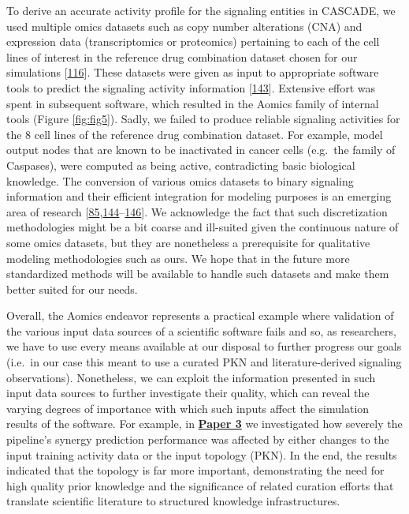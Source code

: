 \documentclass[
  12pt,
]{book}
\begin{document}
To derive an accurate activity profile for the signaling entities in CASCADE, we used multiple omics datasets such as copy number alterations (CNA) and expression data (transcriptomics or proteomics) pertaining to each of the cell lines of interest in the reference drug combination dataset chosen for our simulations {[}\protect\hyperlink{ref-Flobak2019}{116}{]}.
These datasets were given as input to appropriate software tools to predict the signaling activity information {[}\protect\hyperlink{ref-Vaske2010}{143}{]}.
Extensive effort was spent in subsequent software, which resulted in the Aomics family of internal tools (Figure \ref{fig:fig5}).
Sadly, we failed to produce reliable signaling activities for the 8 cell lines of the reference drug combination dataset.
For example, model output nodes that are known to be inactivated in cancer cells (e.g.~the family of Caspases), were computed as being active, contradicting basic biological knowledge.
The conversion of various omics datasets to binary signaling information and their efficient integration for modeling purposes is an emerging area of research {[}\protect\hyperlink{ref-Beal2018}{85},\protect\hyperlink{ref-Martignetti2016}{144}--\protect\hyperlink{ref-Dugourd2021}{146}{]}.
We acknowledge the fact that such discretization methodologies might be a bit coarse and ill-suited given the continuous nature of some omics datasets, but they are nonetheless a prerequisite for qualitative modeling methodologies such as ours.
We hope that in the future more standardized methods will be available to handle such datasets and make them better suited for our needs.

Overall, the Aomics endeavor represents a practical example where validation of the various input data sources of a scientific software fails and so, as researchers, we have to use every means available at our disposal to further progress our goals (i.e.~in our case this meant to use a curated PKN and literature-derived signaling observations).
Nonetheless, we can exploit the information presented in such input data sources to further investigate their quality, which can reveal the varying degrees of importance with which such inputs affect the simulation results of the software.
For example, in \textbf{\protect\hyperlink{Paper3}{Paper 3}} we investigated how severely the pipeline's synergy prediction performance was affected by either changes to the input training activity data or the input topology (PKN).
In the end, the results indicated that the topology is far more important, demonstrating the need for high quality prior knowledge and the significance of related curation efforts that translate scientific literature to structured knowledge infrastructures.
\end{document}

